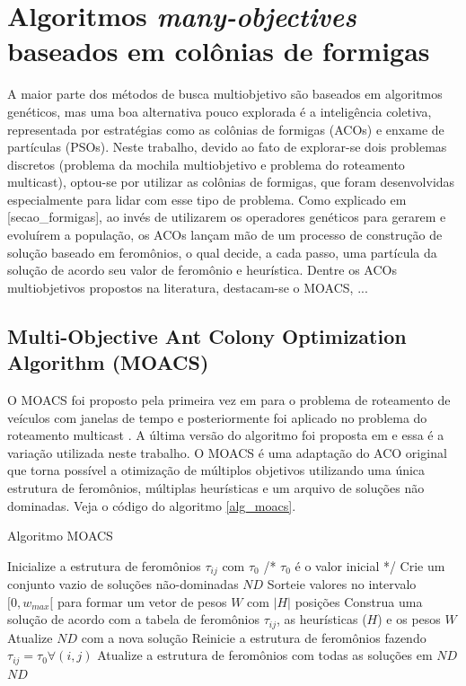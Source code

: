 \section{Algoritmos \textit{many-objectives} baseados em colônias de formigas}

A maior parte dos métodos de busca multiobjetivo são baseados em algoritmos genéticos, mas uma boa alternativa pouco explorada é a inteligência coletiva, representada por estratégias como as colônias de formigas (ACOs) e enxame de partículas (PSOs). Neste trabalho, devido ao fato de explorar-se dois problemas discretos (problema da mochila multiobjetivo e problema do roteamento multicast), optou-se por utilizar as colônias de formigas, que foram desenvolvidas especialmente para lidar com esse tipo de problema. Como explicado em [secao\_formigas], ao invés de utilizarem os operadores genéticos para gerarem e evoluírem a população, os ACOs lançam mão de um processo de construção de solução baseado em feromônios, o qual decide, a cada passo, uma partícula da solução de acordo seu valor de feromônio e heurística. Dentre os ACOs multiobjetivos propostos na literatura, destacam-se o MOACS, ...

\subsection{Multi-Objective Ant Colony Optimization Algorithm (MOACS)}

O MOACS foi proposto pela primeira vez em \cite{Baran2003} para o problema de roteamento de veículos com janelas de tempo e posteriormente foi aplicado no problema do roteamento multicast \cite{Pinto2005}. A última versão do algoritmo foi proposta em \cite{Riveros2016} e essa é a variação utilizada neste trabalho. O MOACS é uma adaptação do ACO original que torna possível a otimização de múltiplos objetivos utilizando uma única estrutura de feromônios, múltiplas heurísticas e um arquivo de soluções não dominadas. Veja o código do algoritmo \ref{alg_moacs}.

\begin{algorithm}
	\caption{Algoritmo MOACS}
	\label{alg_moacs}
	\begin{algorithmic}[1]
		\State Inicialize a estrutura de feromônios $\tau_{ij}$ com $\tau_0$ /* $\tau_{0}$ é o valor inicial */
		\State Crie um conjunto vazio de soluções não-dominadas $ND$
		\State Sorteie valores no intervalo $[0, w_{max}[$ para formar um vetor de pesos $W$ com $|H|$ posições
		\State Construa uma solução de acordo com a tabela de feromônios $\tau_{ij}$, as heurísticas ($H$) e os pesos $W$
		\State Atualize $ND$ com a nova solução
		\EndFor
		\State Reinicie a estrutura de feromônios fazendo $\tau_{ij} = \tau_0 \forall(i,j)$
		\Else
		\State Atualize a estrutura de feromônios com todas as soluções em $ND$
		\EndIf
		\EndWhile
		\State \Return $ND$
	\end{algorithmic}
\end{algorithm}

